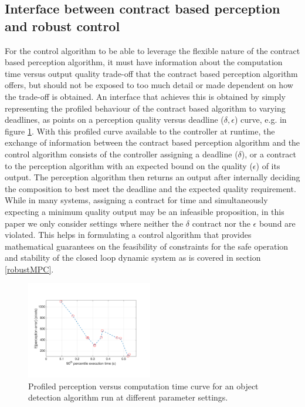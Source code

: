 

\subsection{Interface between contract based perception and robust control}

For the control algorithm to be able to leverage the flexible nature of the contract based perception algorithm, it must have information about the computation time versus output quality trade-off that the contract based perception algorithm offers, but should not be exposed to too much detail or made dependent on how the trade-off is obtained. An interface that achieves this is obtained by simply representing the profiled behaviour of the contract based algorithm to varying deadlines, as points on a perception quality versus deadline ($\delta, \epsilon$) curve, e.g. in figure \ref{fig:eps_delta_toy}.
With this profiled curve available to the controller at runtime, the exchange of information between the contract based perception algorithm and the control algorithm consists of the controller assigning a deadline ($\delta$), or a contract to the perception algorithm with an expected bound on the quality ($\epsilon$) of its output. The perception algorithm then returns an output after internally deciding the composition to best meet the deadline and the expected quality requirement. While in many systems, assigning a contract for time and simultaneously expecting a minimum quality output may be an infeasible proposition, in this paper we only consider settings where neither the $\delta$ contract nor the $\epsilon$ bound are violated. This helps in formulating a control algorithm that provides mathematical guarantees on the feasibility of constraints for the safe operation and stability of the closed loop dynamic system as is covered in section \ref{robustMPC}.

\begin{figure}[t]
	\centering
	\includegraphics[width=0.49\textwidth]{figures/chainErrorDelay}
	\caption{Profiled perception versus computation time curve for an object detection algorithm run at different parameter settings.}
	\label{fig:eps_delta_toy}
\end{figure}

